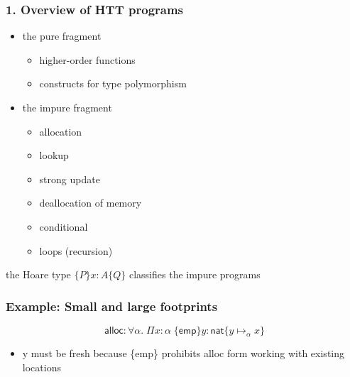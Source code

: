 \documentclass[xcolor=dvipsnames,9pt,hide notes,mathserif]{beamer}
\newcommand{\nat}{\ensuremath{\mathsf{nat}}}
\newcommand{\alloc}{\ensuremath{\mathsf{alloc}}}
\newcommand{\emp}{\ensuremath{\mathsf{emp}}}
\begin{document}
\begin{frame}
  \frametitle{1. Overview of HTT programs}
  \begin{itemize}
  \item the pure fragment
    \begin{itemize}
    \item higher-order functions
    \item constructs for type polymorphism
    \end{itemize}
  \item the impure fragment 
    \begin{itemize}
    \item allocation
    \item lookup
    \item strong update
    \item deallocation of memory
    \item conditional
    \item loops (recursion)
    \end{itemize}
  \end{itemize}
  \vskip1cm
  the Hoare type $\{P\}x:A\{Q\}$ classifies the impure programs
\end{frame}









\begin{frame}
  \frametitle{Example: Small and large footprints}

  \[
   \alloc : \forall \alpha.\; \Pi x{:}\alpha\;  \{\emp \} y {:} \nat \{y \mapsto_\alpha x\}
 \]

  \begin{itemize}
  \item y must be fresh because \{emp\} prohibits alloc form working with existing locations
  \end{itemize}
  
\end{frame}
\end{document}
